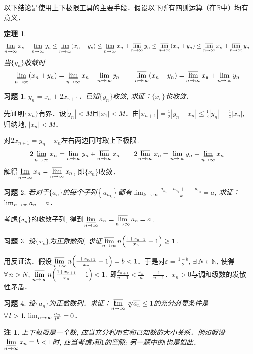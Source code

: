 \documentclass[11pt,a4paper]{ctexart}
\makeatletter
\theoremstyle{thmseries} %
\newtheorem{thm}{定理}[section]
\theoremstyle{exerseries}
\newtheorem{exer}{习题}[section]
\newtheorem*{rem}{注}
\renewenvironment{proof}[1][\proofname]{\par
  \pushQED{\qed}%
  \normalfont \topsep6\p@\@plus6\p@\relax
  \trivlist
  \item[\hskip\labelsep
        \itshape
    #1\@addpunct{}]\ignorespaces
}{%
  \popQED\endtrivlist\@endpefalse
}
\newenvironment{pf}{\begin{proof}[\bfseries\upshape 证\quad]}{\end{proof}}
\newcommand{\bra}[1]{\mathopen{}\left(#1\right)}
\newcommand{\cbra}[1]{\mathopen{}\left\{#1\right\}}
\renewcommand{\epsilon}{\varepsilon}
\newcommand{\R}{\mathbb{R}}
\newcommand{\N}{\mathbb{N}}
\def \nti {\mathnormal{n}\to\infty}
\DeclareMathOperator{\llim}{\underset{\nti}{\underline{\lim}}}
\DeclareMathOperator{\ulim}{\underset{\nti}{\overline{\lim}}}
\makeatother
\begin{document}
以下结论是使用上下极限工具的主要手段．假设以下所有四则运算（在$\overline{\R}$中）均有意义．
\begin{thm}
	\[\llim x_n+\llim y_n\leq\llim\bra{x_n+y_n}\leq\llim x_n+\ulim y_n\leq\ulim\bra{x_n+y_n}\leq\ulim x_n+\ulim y_n\]
	当$\{y_n\}$收敛时, 
	\[\llim\bra{x_n+y_n}=\llim x_n+\lim_{\nti} y_n\qquad\ulim\bra{x_n+y_n}=\ulim x_n+\lim_{\nti} y_n\]
\end{thm}

\begin{exer}
	$y_n=x_n+2x_{n+1}$．已知$\{y_n\}$收敛, 求证：$\{x_n\}$也收敛．
\end{exer}
\begin{pf}
	先证明$\{x_n\}$有界．设$|y_n|<M$且$|x_1|<M$．由$|x_{n+1}|=\frac{1}{2}|y_n-x_n|\leq\frac{1}{2}|y_n|+\frac{1}{2}|x_n|$, 归纳地, $|x_n|<M$．

	对$2x_{n+1}=y_n-x_n$左右两边同时取上下极限．
	\[2\llim x_n=\lim_{\nti}y_n+\ulim x_n\qquad2\ulim x_n=\lim_{\nti}y_n+\llim x_n\]
	解得$\llim x_n=\ulim x_n$, 即$\{x_n\}$收敛．
\end{pf}

\begin{exer}
	若对于$\{a_n\}$的每个子列$\cbra{a_{n_k}}$都有$\lim_{k\to\infty}\frac{a_{n_1}+a_{n_2}+\cdots+a_{n_k}}{k}=a$, 求证：$\lim_{\nti}a_n=a$．
\end{exer}
\begin{pf}
	考虑$\{a_n\}$的收敛子列, 得到$\llim a_n=\ulim a_n=a$．
\end{pf}

\begin{exer}
	设$\{x_n\}$为正数数列, 求证$\ulim n\bra{\frac{1+x_{n+1}}{x_n}-1}\geq1$．
\end{exer}
\begin{pf}
	用反证法．假设$\ulim n\bra{\frac{1+x_{n+1}}{x_n}-1}=b<1$．于是对$\epsilon=\frac{1-b}{2},\,\exists\,N\in\N$, 使得$\forall\,n>N,\,\ulim n\bra{\frac{1+x_{n+1}}{x_n}-1}<1$, 即$\frac{x_{n+1}}{n+1}<\frac{x_n}{n}-\frac{1}{n+1}$．$x_n>0$与调和级数的发散性矛盾．
\end{pf}

\begin{exer}
	设$\{a_n\}$为正数数列．求证：$\ulim \sqrt[n]{a_n}\leq1$的充分必要条件是$\forall\,l>1,\,\lim_{\nti}\frac{a_n}{l^n}=0$．
\end{exer}
\begin{rem}
	上下极限是一个数, 应当充分利用它和已知数的大小关系．例如假设$\llim x_n=b<1$时, 应当考虑$b$和$1$的空隙; 另一题中的$l$也是如此．
\end{rem}
\end{document}
